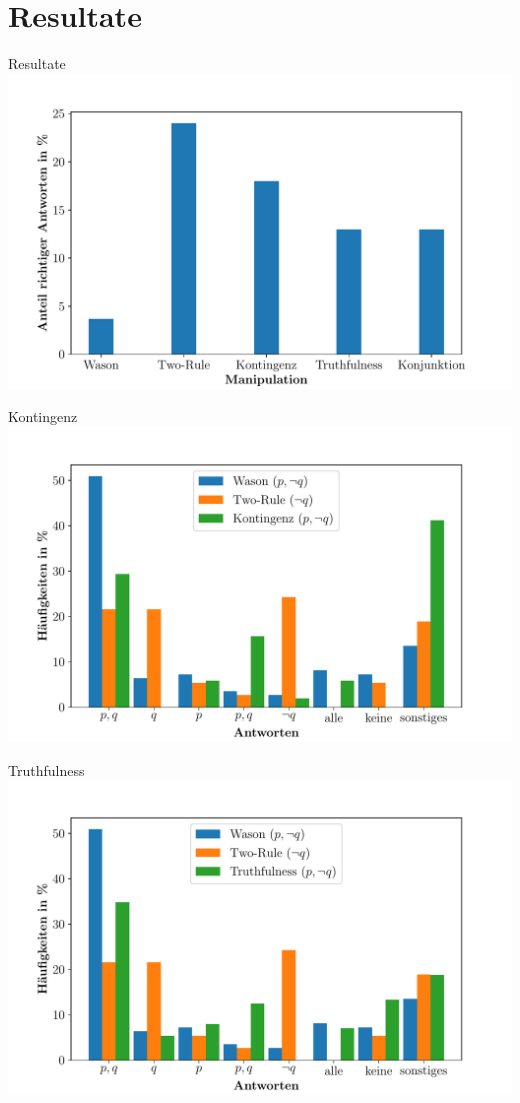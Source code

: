 
\section{Resultate}

\begin{frame}{Resultate}
    \includegraphics[width=\textwidth]{../plot/results_correct.pdf}
\end{frame}


\begin{frame}{Kontingenz}
    \includegraphics[width=\textwidth]{../plot/results_contingency.pdf}
\end{frame}


\begin{frame}{Truthfulness}
    \includegraphics[width=\textwidth]{../plot/results_truthfulness.pdf}
\end{frame}


